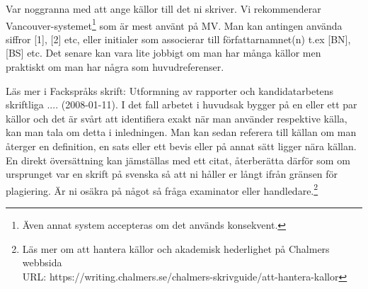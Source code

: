 



% 

Var noggranna med att ange källor till det ni skriver. Vi rekommenderar Vancouver-systemet\footnote{Även annat system accepteras om det används konsekvent.} som är mest använt på MV. Man kan antingen använda siffror [1], [2] etc, eller initialer som associerar till författarnamnet(n) t.ex [BN], [BS] etc. Det senare kan vara lite jobbigt om man har många källor men praktiskt om man har några som huvudreferenser.


Läs mer i Fackspråks skrift: Utformning av rapporter och kandidatarbetens skriftliga .... (2008-01-11)\cite{rapp}.
I det fall arbetet i huvudsak bygger på en eller ett par källor och det är svårt att identifiera exakt när man använder respektive källa, kan man tala om detta i inledningen. Man kan sedan referera till källan om man återger en definition, en sats eller ett bevis eller på annat sätt ligger nära källan. En direkt översättning kan jämställas med ett citat, återberätta därför som om ursprunget var en skrift på svenska så att ni håller er långt ifrån gränsen för plagiering. Är ni osäkra på något så fråga examinator eller handledare.\footnote{Läs mer om att hantera källor och akademisk hederlighet på Chalmers webbsida \hfill \\ URL: https://writing.chalmers.se/chalmers-skrivguide/att-hantera-kallor  }
%  